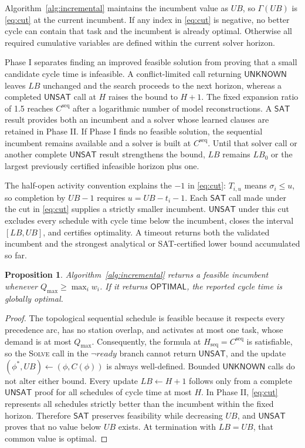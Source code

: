 \documentclass[]{interact}
\theoremstyle{plain}
\newtheorem{proposition}[theorem]{Proposition}
\theoremstyle{definition}
\theoremstyle{remark}
\newcommand{\Qmax}{Q_{\max}}
\newcommand{\LBzero}{\ensuremath{LB_0}}
\newcommand{\Status}[1]{\ensuremath{\mathsf{#1}}}
\begin{document}
Algorithm~\ref{alg:incremental} maintains the incumbent value as $UB$, so $\Gamma(UB)$ is \eqref{eq:cut} at the current incumbent. If any index in \eqref{eq:cut} is negative, no better cycle can contain that task and the incumbent is already optimal. Otherwise all required cumulative variables are defined within the current solver horizon.

Phase I separates finding an improved feasible solution from proving that a small candidate cycle time is infeasible. A conflict-limited call returning \Status{UNKNOWN} leaves $LB$ unchanged and the search proceeds to the next horizon, whereas a completed \Status{UNSAT} call at $H$ raises the bound to $H+1$. The fixed expansion ratio of 1.5 reaches $C^{\mathrm{seq}}$ after a logarithmic number of model reconstructions. A \Status{SAT} result provides both an incumbent and a solver whose learned clauses are retained in Phase II. If Phase I finds no feasible solution, the sequential incumbent remains available and a solver is built at $C^{\mathrm{seq}}$. Until that solver call or another complete \Status{UNSAT} result strengthens the bound, $LB$ remains $\LBzero$ or the largest previously certified infeasible horizon plus one.

The half-open activity convention explains the $-1$ in \eqref{eq:cut}: $T_{i,u}$ means $\sigma_i\leq u$, so completion by $UB-1$ requires $u=UB-t_i-1$. Each \Status{SAT} call made under the cut in \eqref{eq:cut} supplies a strictly smaller incumbent. \Status{UNSAT} under this cut excludes every schedule with cycle time below the incumbent, closes the interval $[LB,UB]$, and certifies optimality. A timeout returns both the validated incumbent and the strongest analytical or SAT-certified lower bound accumulated so far.

\begin{proposition}
Algorithm~\ref{alg:incremental} returns a feasible incumbent whenever $\Qmax\geq\max_i w_i$. If it returns \Status{OPTIMAL}, the reported cycle time is globally optimal.
\end{proposition}

\begin{proof}
The topological sequential schedule is feasible because it respects every precedence arc, has no station overlap, and activates at most one task, whose demand is at most $\Qmax$. Consequently, the formula at $H_{\mathrm{seq}}=C^{\mathrm{seq}}$ is satisfiable, so the \textsc{Solve} call in the $\neg\mathit{ready}$ branch cannot return \Status{UNSAT}, and the update $(\phi^*,UB)\gets(\phi,C(\phi))$ is always well-defined. Bounded \Status{UNKNOWN} calls do not alter either bound. Every update $LB\gets H+1$ follows only from a complete \Status{UNSAT} proof for all schedules of cycle time at most $H$. In Phase II, \eqref{eq:cut} represents all schedules strictly better than the incumbent within the fixed horizon. Therefore \Status{SAT} preserves feasibility while decreasing $UB$, and \Status{UNSAT} proves that no value below $UB$ exists. At termination with $LB=UB$, that common value is optimal.
\end{proof}
\end{document}
